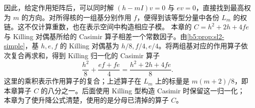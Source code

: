 因此，给定作用矩阵后，可以同时解 \((h-mI)v=0\) 与 \(ev=0\)，直接找到最高权为 \(m\) 的方向。对所得核的一组基分别作用 \(f\)，便得到该等型分量中各份 \(L_m\) 的权链。这不仅计算重数，也在表示空间中构造相应子模。
\ProseParagraphBreak
本章的 \(C=h^2+2h+4fe\) 与 Killing 对偶基所给的 Casimir 算子相差一个常数因子。由\cref{b5:prop:sl2-simple}，基 \(h,e,f\) 的 Killing 对偶基为 \(h/8,f/4,e/4\)。将两组基对应的作用算子依次复合再求和，得到 Killing 归一化的 Casimir 算子
\[
	\frac{h^2}{8}+\frac{ef+fe}{4} =\frac{h^2+2h+4fe}{8}.
\]
这里的乘积表示作用算子的复合；上述算子在 \(L_m\) 上的标量是 \(m(m+2)/8\)，即本章算子 \(C\) 的八分之一。后面使用 Killing 型构造 Casimir 时保留这一归一化；本章为了使升降公式清楚，使用的是分母已清掉的算子 \(C\)。
